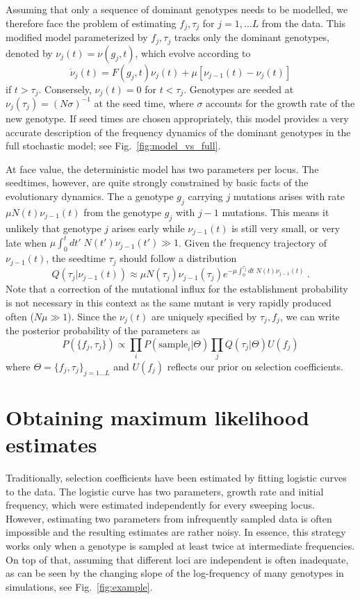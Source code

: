 \documentclass[rmp,twocolumn]{revtex4}
\newcommand{\FIG}[1]{Fig.~\ref{fig:#1}}
\newcommand{\gt}{g}
\newcommand{\fcoeff}{f}
\begin{document}
Assuming that only a sequence of dominant genotypes needs to be modelled, we
therefore face the problem of estimating $\fcoeff_j,\tau_j$ for $j=1,\ldots L$
from the data. This modified model parameterized by $\fcoeff_j,\tau_j$ tracks
only the dominant genotypes, denoted by $\nu_j(t)=\nu(\gt_j,t)$, which evolve
according to
\begin{equation}
\dot \nu_j(t) = F(\gt_j,t)\nu_j(t) +\mu [\nu_{j-1}(t) - \nu_{j}(t)]
\end{equation}
if $t>\tau_j$. Consersely, $\nu_j(t)=0$ for $t<\tau_j$. Genotypes are
seeded at $\nu_j(\tau_j)= (N\sigma)^{-1}$ at the seed time, where $\sigma$
accounts for the growth rate of the new genotype. If seed times are chosen
appropriately, this model provides a very accurate description of the frequency
dynamics of the dominant genotypes in the full stochastic model; see \FIG{model_vs_full}.

At face value, the deterministic model has two parameters per locus. The
seedtimes, however, are quite strongly constrained by basic facts of the
evolutionary dynamics. The a genotype $\gt_j$ carrying $j$ mutations arises with
rate $\mu N(t)\nu_{j-1}(t)$ from the genotype $\gt_j$ with $j-1$ mutations. This
means it unlikely that genotype $j$ arises early while $\nu_{j-1}(t)$ is still
very small, or very late when $\mu\int_0^tdt'\; N(t')
\nu_{j-1}(t')\gg 1$. Given the frequency trajectory of $\nu_{j-1}(t)$, the
seedtime $\tau_j$ should follow a distribution
\begin{equation}
\label{eq:seedtimes}
Q(\tau_j | \nu_{j-1}(t)) \approx \mu N(\tau_j)\nu_{j-1}(\tau_j) e^{-\mu
\int_0^{\tau_j}dt\; N(t)\nu_{j-1}(t)} \ .
\end{equation}
Note that a correction of the mutational influx for the establishment
probability is not necessary in this context as the same mutant is very rapidly
produced often ($N\mu\gg 1$).
Since the $\nu_j(t)$ are uniquely specified by $\tau_j,\fcoeff_j$, we can
write the posterior probability of the parameters as 
\begin{equation}
P(\{\fcoeff_j,\tau_j\})  \propto \prod_{i} P(\mathrm{sample}_i|\Theta)\prod_j
Q(\tau_j|\Theta)U(\fcoeff_j)
\end{equation}
where $\Theta = \{ \fcoeff_j,\tau_j\}_{j=1\ldots L}$ and $U(\fcoeff_j)$
reflects our prior on selection coefficients.


\section*{Obtaining maximum likelihood estimates} Traditionally, selection
coefficients have been estimated by fitting logistic curves to the
data\citep{Asquith:2006p28003,Ganusov:2011p43139}. The logistic curve has two
parameters, growth rate and initial frequency, which were estimated
independently for every sweeping locus.
However, estimating two parameters from infrequently sampled data is often
impossible and the resulting estimates are rather noisy. In essence, this
strategy works only when a genotype is sampled at least twice at intermediate
frequencies. On top of that, assuming that different loci are independent is
often inadequate, as can be seen by the changing slope of the log-frequency of
many genotypes in simulations, see \FIG{example}.
\end{document}
